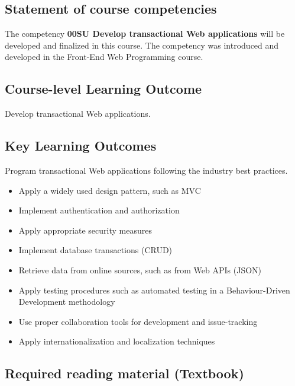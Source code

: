 \documentclass[
  10pt,
]{article}
\providecommand{\tightlist}{%
  \setlength{\itemsep}{0pt}\setlength{\parskip}{0pt}}
\begin{document}
\hypertarget{statement-of-course-competencies}{%
\subsection*{Statement of course
competencies}\label{statement-of-course-competencies}}

The competency \textbf{00SU Develop transactional Web applications} will
be developed and finalized in this course. The competency was introduced
and developed in the Front-End Web Programming course.

\hypertarget{course-level-learning-outcome}{%
\subsection*{Course-level Learning
Outcome}\label{course-level-learning-outcome}}

Develop transactional Web applications.

\hypertarget{key-learning-outcomes}{%
\subsection*{Key Learning Outcomes}\label{key-learning-outcomes}}

Program transactional Web applications following the industry best
practices.

\begin{itemize}
\tightlist
\item
  Apply a widely used design pattern, such as MVC
\item
  Implement authentication and authorization
\item
  Apply appropriate security measures
\item
  Implement database transactions (CRUD)
\item
  Retrieve data from online sources, such as from Web APIs (JSON)
\item
  Apply testing procedures such as automated testing in a
  Behaviour-Driven Development methodology
\item
  Use proper collaboration tools for development and issue-tracking
\item
  Apply internationalization and localization techniques
\end{itemize}

\hypertarget{required-reading-material-textbook}{%
\subsection*{Required reading material
(Textbook)}\label{required-reading-material-textbook}}
\end{document}
